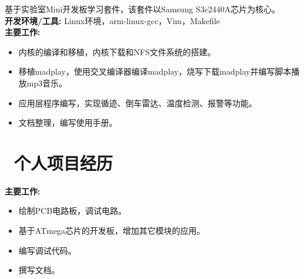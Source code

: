 \documentclass{resume}
\begin{document}


\begin{onehalfspacing}
  基于实验室Mini开发板学习套件，该套件以Samsung S3c2440A芯片为核心。\\
   \textbf {开发环境/工具:}  Linux环境，arm-linux-gcc，Vim，Makefile\\
  \textbf {主要工作:}
  \begin{itemize}

    \item 内核的编译和移植，内核下载和NFS文件系统的搭建。
    \item 移植madplay，使用交叉编译器编译madplay，烧写下载madplay并编写脚本播放mp3音乐。
    \item 应用层程序编写，实现循迹、倒车雷达、温度检测、报警等功能。
    \item 文档整理，编写使用手册。
  \end{itemize}

\end{onehalfspacing}




%
%
%
%

\section{\faFax\ 个人项目经历}


\begin{onehalfspacing}
  \textbf {主要工作:}
\begin{itemize}
  \item 绘制PCB电路板，调试电路。
  \item 基于ATmega芯片的开发板，增加其它模块的应用。
  \item 编写调试代码。
  \item 撰写文档。
\end{itemize}

\end{onehalfspacing}
\end{document}
